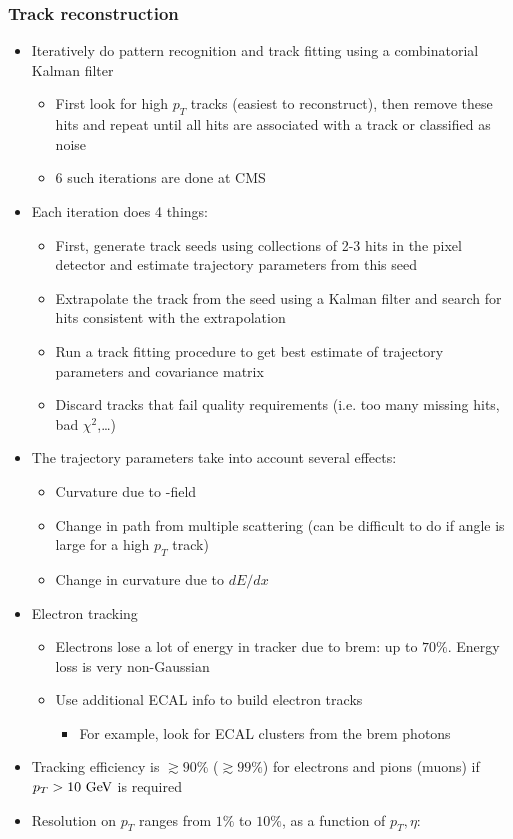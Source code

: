 \subsubsection{Track reconstruction}
\begin{itemize}
  \item Iteratively do pattern recognition and track fitting using a combinatorial Kalman filter
  \begin{itemize}
    \item First look for high $p_T$ tracks (easiest to reconstruct), then remove these hits and repeat until all hits are associated with a track or classified as noise
    \item 6 such iterations are done at CMS
  \end{itemize}
  \item Each iteration does 4 things:
  \begin{itemize}
    \item First, generate track seeds using collections of 2-3 hits in the pixel detector and estimate trajectory parameters from this seed
    \item Extrapolate the track from the seed using a Kalman filter and search for hits consistent with the extrapolation
    \item Run a track fitting procedure to get best estimate of trajectory parameters and covariance matrix
    \item Discard tracks that fail quality requirements (i.e. too many missing hits, bad $\chi^2$,\dots)
  \end{itemize}
  \item The trajectory parameters take into account several effects:
  \begin{itemize}
    \item Curvature due to \B-field
    \item Change in path from multiple scattering (can be difficult to do if angle is large for a high $p_T$ track)
    \item Change in curvature due to $dE/dx$
  \end{itemize}
  \item Electron tracking
  \begin{itemize}
    \item Electrons lose a lot of energy in tracker due to brem: up to $70\%$. Energy loss is very non-Gaussian
    \item Use additional ECAL info to build electron tracks
    \begin{itemize}
      \item For example, look for ECAL clusters from the brem photons
    \end{itemize}
  \end{itemize}
  \item Tracking efficiency is $\gtrsim90\%$ ($\gtrsim99\%$) for electrons and pions (muons) if $p_T>10~\text{GeV}$ is required
  \item Resolution on $p_T$ ranges from $1\%$ to $10\%$, as a function of $p_T,\eta$:
\end{itemize}

